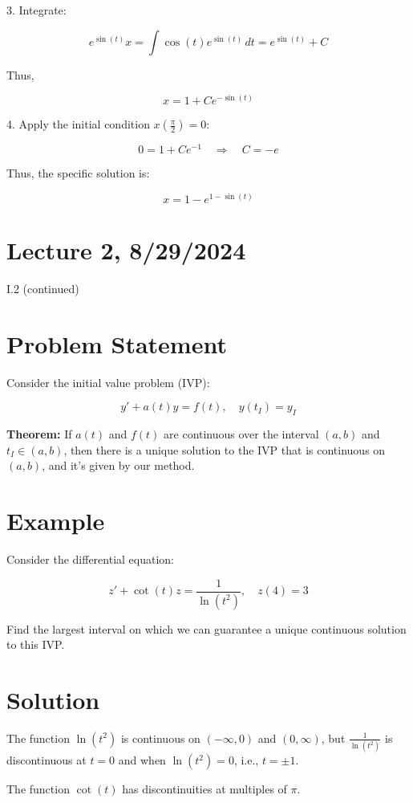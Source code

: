 \documentclass{article}
\begin{document}
3. Integrate:

\[
e^{\sin(t)} x = \int \cos(t) e^{\sin(t)} \, dt = e^{\sin(t)} + C
\]

Thus,

\[
x = 1 + C e^{-\sin(t)}
\]

4. Apply the initial condition \( x\left(\frac{\pi}{2}\right) = 0 \):

\[
0 = 1 + C e^{-1} \quad \Rightarrow \quad C = -e
\]

Thus, the specific solution is:

\[
x = 1 - e^{1 - \sin(t)}
\]

\section*{Lecture 2, 8/29/2024}

I.2 (continued)

\section*{Problem Statement}

Consider the initial value problem (IVP):

\[
y' + a(t)y = f(t), \quad y(t_I) = y_I
\]

\textbf{Theorem:}  
If \( a(t) \) and \( f(t) \) are continuous over the interval \( (a, b) \) and \( t_I \in (a, b) \), then there is a unique solution to the IVP that is continuous on \( (a, b) \), and it's given by our method.

\section*{Example}

Consider the differential equation:

\[
z' + \cot(t)z = \frac{1}{\ln(t^2)}, \quad z(4) = 3
\]

Find the largest interval on which we can guarantee a unique continuous solution to this IVP.

\section*{Solution}

The function \( \ln(t^2) \) is continuous on \( (-\infty, 0) \) and \( (0, \infty) \), but \( \frac{1}{\ln(t^2)} \) is discontinuous at \( t = 0 \) and when \( \ln(t^2) = 0 \), i.e., \( t = \pm 1 \).

The function \( \cot(t) \) has discontinuities at multiples of \( \pi \).
\end{document}
